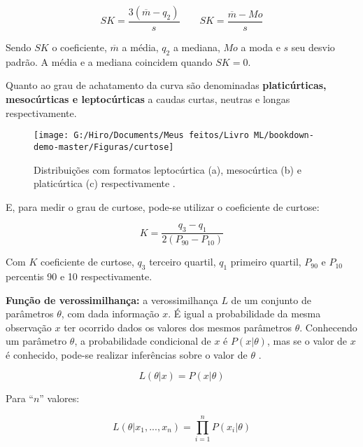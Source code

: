 \documentclass[
  openany]{book}
\begin{document}
\begin{equation}
    SK=\frac{3(\overline{m}-q_2)}{s} \quad \quad SK=\frac{\overline{m}-Mo}{s}
     \label{eq:coefassimetria}
\end{equation}

Sendo \(SK\) o coeficiente, \(\overline{m}\) a média, \(q_2\) a mediana, \(Mo\) a moda e \(s\) seu desvio padrão. A média e a mediana coincidem quando \(SK=0\).

Quanto ao grau de achatamento da curva são denominadas \textbf{platicúrticas, mesocúrticas e leptocúrticas} a caudas curtas, neutras e longas respectivamente.

\begin{figure}

{\centering \texttt{[image: G:/Hiro/Documents/Meus feitos/Livro ML/bookdown-demo-master/Figuras/curtose]} 

}

\caption{Distribuições com formatos leptocúrtica (a), mesocúrtica (b) e platicúrtica (c) respectivamente \citep{freund2009estatistica}.}\label{fig:curtose}
\end{figure}



E, para medir o grau de curtose, pode-se utilizar o coeficiente de curtose:

\begin{equation}
    K=\frac{q_3-q_1}{2(P_{90}-P_{10})}
    \label{eq:curtose}
\end{equation}

Com \(K\) coeficiente de curtose, \(q_3\) terceiro quartil, \(q_1\) primeiro quartil, \(P_{90}\) e \(P_{10}\) percentis 90 e 10 respectivamente.

\textbf{Função de verossimilhança:} a verossimilhança \(L\) de um conjunto de parâmetros \(\theta\), com dada informação \(x\). É igual a probabilidade da mesma observação \(x\) ter ocorrido dados os valores dos mesmos parâmetros \(\theta\). Conhecendo um parâmetro \(\theta\), a probabilidade condicional de \(x\) é \(P(x|\theta)\), mas se o valor de \(x\) é conhecido, pode-se realizar inferências sobre o valor de \(\theta\) \citep{bolfarine2001introduccao}.

\begin{equation} 
 L(\theta |x)=P(x| \theta)
  \label{eq:fverossimilhanca}
\end{equation}

Para ``\(n\)'' valores:

\begin{equation} 
 L(\theta |x_1,..., x_n)=\prod_{i=1}^{n} P(x_i| \theta)
  \label{eq:fsumverossimilhanca}
\end{equation}
\end{document}
